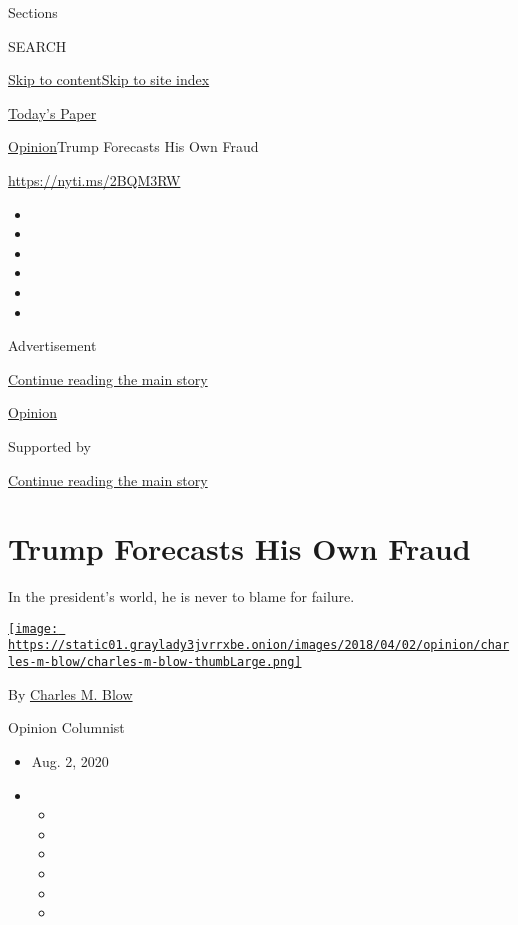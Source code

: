 Sections

SEARCH

\protect\hyperlink{site-content}{Skip to
content}\protect\hyperlink{site-index}{Skip to site index}

\href{https://myaccount.nytimes3xbfgragh.onion/auth/login?response_type=cookie\&client_id=vi}{}

\href{https://www.nytimes3xbfgragh.onion/section/todayspaper}{Today's
Paper}

\href{/section/opinion}{Opinion}\textbar{}Trump Forecasts His Own Fraud

\url{https://nyti.ms/2BQM3RW}

\begin{itemize}
\item
\item
\item
\item
\item
\item
\end{itemize}

Advertisement

\protect\hyperlink{after-top}{Continue reading the main story}

\href{/section/opinion}{Opinion}

Supported by

\protect\hyperlink{after-sponsor}{Continue reading the main story}

\hypertarget{trump-forecasts-his-own-fraud}{%
\section{Trump Forecasts His Own
Fraud}\label{trump-forecasts-his-own-fraud}}

In the president's world, he is never to blame for failure.

\href{https://www.nytimes3xbfgragh.onion/by/charles-m-blow}{\texttt{[image: https://static01.graylady3jvrrxbe.onion/images/2018/04/02/opinion/charles-m-blow/charles-m-blow-thumbLarge.png]}}

By \href{https://www.nytimes3xbfgragh.onion/by/charles-m-blow}{Charles
M. Blow}

Opinion Columnist

\begin{itemize}
\item
  Aug. 2, 2020
\item
  \begin{itemize}
  \item
  \item
  \item
  \item
  \item
  \item
  \end{itemize}
\end{itemize}


